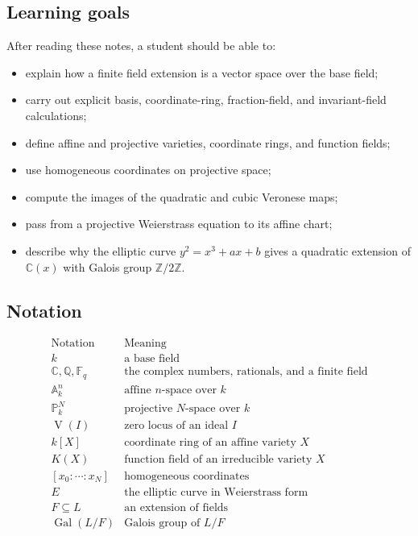 \documentclass[11pt]{article}
\theoremstyle{definition}
\theoremstyle{remark}
\newcommand{\A}{\mathbb{A}}
\newcommand{\C}{\mathbb{C}}
\newcommand{\F}{\mathbb{F}}
\newcommand{\Pj}{\mathbb{P}}
\newcommand{\Q}{\mathbb{Q}}
\newcommand{\Z}{\mathbb{Z}}
\newcommand{\K}{K}
\newcommand{\V}{\operatorname{V}}
\newcommand{\Gal}{\operatorname{Gal}}
\begin{document}
\subsection*{Learning goals}

After reading these notes, a student should be able to:
\begin{itemize}
\item explain how a finite field extension is a vector space over the base
field;
\item carry out explicit basis, coordinate-ring, fraction-field, and
invariant-field calculations;
\item define affine and projective varieties, coordinate rings, and function
fields;
\item use homogeneous coordinates on projective space;
\item compute the images of the quadratic and cubic Veronese maps;
\item pass from a projective Weierstrass equation to its affine chart;
\item describe why the elliptic curve \(y^2=x^3+ax+b\) gives a quadratic
extension of \(\C(x)\) with Galois group \(\Z/2\Z\).
\end{itemize}

\subsection*{Notation}

\[
\begin{array}{c|l}
\text{Notation} & \text{Meaning}\\ \hline
k & \text{a base field}\\
\C,\Q,\F_q & \text{the complex numbers, rationals, and a finite field}\\
\A^n_k & \text{affine }n\text{-space over }k\\
\Pj^N_k & \text{projective }N\text{-space over }k\\
\V(I) & \text{zero locus of an ideal }I\\
k[X] & \text{coordinate ring of an affine variety }X\\
\K(X) & \text{function field of an irreducible variety }X\\
{[x_0:\cdots:x_N]} & \text{homogeneous coordinates}\\
E & \text{the elliptic curve in Weierstrass form}\\
F\subseteq L & \text{an extension of fields}\\
\Gal(L/F) & \text{Galois group of }L/F
\end{array}
\]
\end{document}
